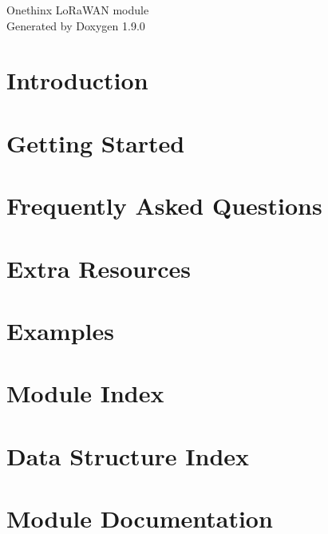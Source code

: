 \let\mypdfximage\pdfximage\def\pdfximage{\immediate\mypdfximage}\documentclass[twoside]{book}
\newcommand{\+}{\discretionary{\mbox{\scriptsize$\hookleftarrow$}}{}{}}
\newcommand{\clearemptydoublepage}{%
  \newpage{\pagestyle{empty}\cleardoublepage}%
}
\begin{document}
\raggedbottom

\hypersetup{pageanchor=false,
             bookmarksnumbered=true,
             pdfencoding=unicode
            }
\begin{titlepage}
\vspace*{7cm}
\begin{center}%
{\Large Onethinx Lo\+Ra\+WAN module }\\
\vspace*{1cm}
{\large Generated by Doxygen 1.9.0}\\
\end{center}
\end{titlepage}
\clearemptydoublepage
{}
\tableofcontents
\clearemptydoublepage
{}
\hypersetup{pageanchor=true}

\chapter{Introduction}
\label{intro}

\chapter{Getting Started}
\label{getstart}

\chapter{Frequently Asked Questions}
\label{_f_a_q}

\chapter{Extra Resources}
\label{extra_resources}

\chapter{Examples}
\label{ex_examples}

\chapter{Module Index}

\chapter{Data Structure Index}

\chapter{Module Documentation}
















\end{document}
